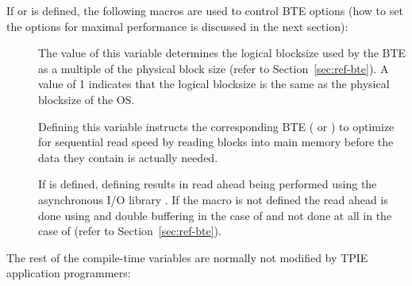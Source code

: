 \noindent
If  or  is
defined, the following macros are used to control BTE
options (how to set the options for maximal performance is
discussed in the next section):

  \begin{description}

  \item[]
  \item[] The
  value of this variable determines the logical blocksize
  used by the BTE as a multiple of the physical block size
  (refer to Section~\ref{sec:ref-bte}). A value of 1
  indicates that the logical blocksize is the same as the
  physical blocksize of the OS.

  \item[{}] 
  \item[{}] Defining this
  variable instructs the corresponding BTE (
  or ) to optimize for sequential read speed
  by reading blocks into main memory before the data they
  contain is actually needed.
  
  \item[{}] If
   is defined, defining
   results in read ahead being performed
  using the asynchronous I/O library . If the
  macro {} is not defined the read ahead
  is done using  and double buffering in the
  case of  and not done at all in the
  case of  (refer to
  Section~\ref{sec:ref-bte}).
  \end{description}

\noindent
The rest of the compile-time variables are normally not
modified by TPIE application programmers:

